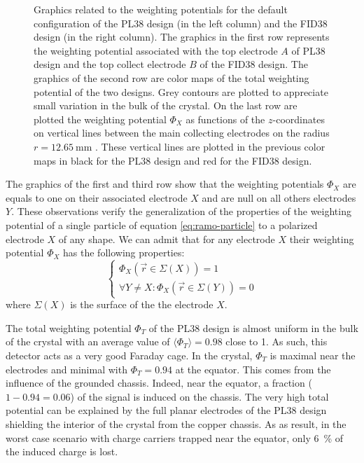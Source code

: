 \begin{figure}
\begin{minipage}{0.48\textwidth}
\end{minipage}
\caption{Graphics related to the weighting potentials for the default configuration of the PL38 design (in the left column) and the FID38 design (in the right column). The graphics in the first row represents the weighting potential associated with the top electrode $A$ of PL38 design and the top collect electrode $B$ of the FID38 design. The graphics of the second row are color maps of the total weighting potential of the two designs. Grey contours are plotted to appreciate small variation in the bulk of the crystal. On the last row are plotted the weighting potential $\Phi_X$ as functions of the $z$-coordinates on vertical lines between the main collecting electrodes on the radius $r=\SI{12.65}{\mm}$ . These vertical lines are plotted in the previous color maps in black for the PL38 design and red for the FID38 design.}
\label{fig:pl38-fid38-weighting-potential}
\end{figure}

The graphics of the first and third row show that the weighting potentials $\Phi_X$ are equals to one on their associated electrode $X$ and are null on all others electrodes $Y$. These observations verify the generalization of the properties of the weighting potential of a single particle of equation \ref{eq:ramo-particle} to a polarized electrode $X$ of any shape. We can admit that for any electrode $X$ their weighting potential $\Phi_X$ has the following properties:
\begin{equation}
\label{eq:ramo-electrode}
\begin{cases}
\Phi_X \left( \vec{r} \in \Sigma(X) \right) = 1 \\
\forall Y \neq X: \Phi_X \left( \vec{r} \in \Sigma(Y) \right) = 0
\end{cases}
\end{equation} 
where $\Sigma(X)$ is the surface of the the electrode $X$.


The total weighting potential $\Phi_T$ of the PL38 design is almost uniform in the bulk of the crystal with an average value of $\langle \Phi_T \rangle = 0.98$ close to 1. As such, this detector acts as a very good Faraday cage. In the crystal, $\Phi_T$ is maximal near the electrodes and minimal with $\Phi_T = 0.94$ at the equator. This comes from the influence of the grounded chassis. Indeed, near the equator, a fraction ($1-0.94=0.06$) of the signal is induced on the chassis. The very high total potential can be explained by the full planar electrodes of the PL38 design shielding the interior of the crystal from the copper chassis. As as result, in the worst case scenario with charge carriers trapped near the equator, only \SI{6}{\percent} of the induced charge is lost.

